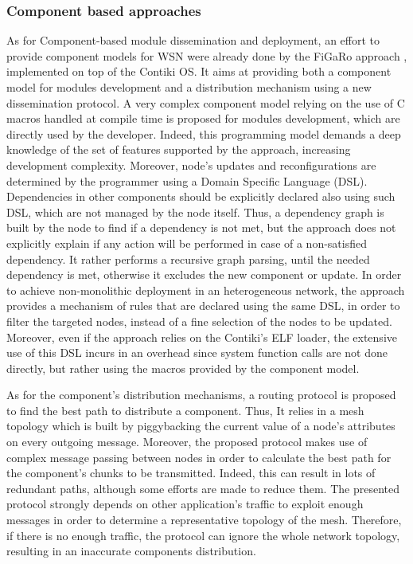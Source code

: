 \subsubsection*{Component based approaches}
As for Component-based module dissemination and deployment, an effort to provide component models for WSN were already done by the FiGaRo approach \cite{mottola2008figaro}, implemented on top of the Contiki OS.
It aims at providing both a component model for modules development and a distribution mechanism using a new dissemination protocol.
A very complex component model relying on the use of C macros handled at compile time is proposed for modules development, which are directly used by the developer.
Indeed, this programming model demands a deep knowledge of the set of features supported by the approach, increasing development complexity.
Moreover, node's updates and reconfigurations are determined by the programmer using a Domain Specific Language (DSL).
Dependencies in other components should be explicitly declared also using such DSL, which are not managed by the node itself.
Thus, a dependency graph is built by the node to find if a dependency is not met, but the approach does not explicitly explain if any action will be performed in case of a non-satisfied dependency.
It rather performs a recursive graph parsing, until the needed dependency is met, otherwise it excludes the new component or update.
In order to achieve non-monolithic deployment in an heterogeneous network, the approach provides a mechanism of rules that are declared using the same DSL, in order to filter the targeted nodes, instead of a fine selection of the nodes to be updated.
Moreover, even if the approach relies on the Contiki's ELF loader, the extensive use of this DSL incurs in an overhead since system function calls are not done directly, but rather using the macros provided by the component model.
	
As for the component's distribution mechanisms, a routing protocol is proposed to find the best path to distribute a component.
Thus, It relies in a mesh topology which is built by piggybacking the current value of a node's attributes on every outgoing message.
Moreover, the proposed protocol makes use of complex message passing between nodes in order to calculate the best path for the component's chunks to be transmitted.
Indeed, this can result in lots of redundant paths, although some efforts are made to reduce them.
The presented protocol strongly depends on other application's traffic to exploit enough messages in order to determine a representative topology of the mesh.
Therefore, if there is no enough traffic, the protocol can ignore the whole network topology, resulting in an inaccurate components distribution.

